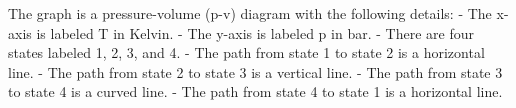 The graph is a pressure-volume (p-v) diagram with the following details:
- The x-axis is labeled T in Kelvin.
- The y-axis is labeled p in bar.
- There are four states labeled 1, 2, 3, and 4.
- The path from state 1 to state 2 is a horizontal line.
- The path from state 2 to state 3 is a vertical line.
- The path from state 3 to state 4 is a curved line.
- The path from state 4 to state 1 is a horizontal line.